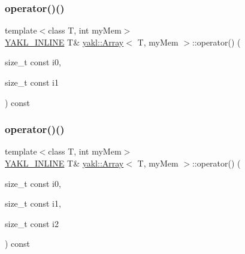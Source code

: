 \mbox{\label{classyakl_1_1Array_a81dec897528782d71fda9fbd6a1bfd44}} 
\subsubsection{\texorpdfstring{operator()()}{operator()()}\hspace{0.1cm}{\footnotesize\ttfamily [2/8]}}
{\footnotesize\ttfamily template$<$class T, int my\+Mem$>$ \\
\hyperlink{YAKL_8h_aa0dd629ffce6d564b19e9313fb91a5ad}{Y\+A\+K\+L\+\_\+\+I\+N\+L\+I\+NE} T\& \hyperlink{classyakl_1_1Array}{yakl\+::\+Array}$<$ T, my\+Mem $>$\+::operator() (\begin{DoxyParamCaption}\item[{size\+\_\+t const}]{i0,  }\item[{size\+\_\+t const}]{i1 }\end{DoxyParamCaption}) const\hspace{0.3cm}{\ttfamily [inline]}}

\mbox{\label{classyakl_1_1Array_aaa835a0783d5f01a0909d96d2d42d725}} 
\subsubsection{\texorpdfstring{operator()()}{operator()()}\hspace{0.1cm}{\footnotesize\ttfamily [3/8]}}
{\footnotesize\ttfamily template$<$class T, int my\+Mem$>$ \\
\hyperlink{YAKL_8h_aa0dd629ffce6d564b19e9313fb91a5ad}{Y\+A\+K\+L\+\_\+\+I\+N\+L\+I\+NE} T\& \hyperlink{classyakl_1_1Array}{yakl\+::\+Array}$<$ T, my\+Mem $>$\+::operator() (\begin{DoxyParamCaption}\item[{size\+\_\+t const}]{i0,  }\item[{size\+\_\+t const}]{i1,  }\item[{size\+\_\+t const}]{i2 }\end{DoxyParamCaption}) const\hspace{0.3cm}{\ttfamily [inline]}}

\mbox{\label{classyakl_1_1Array_afb9a5d745da5ef356b680b89daaccd72}} 
